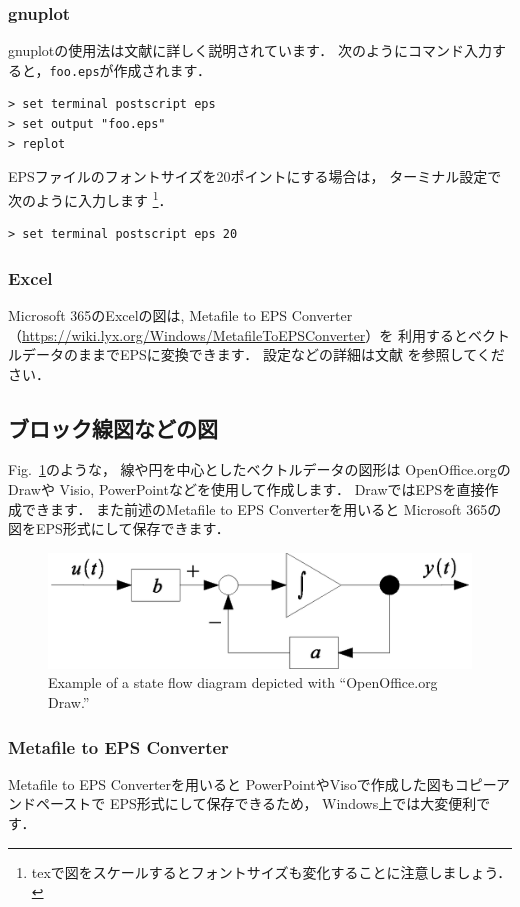 \documentclass[twocolumn]{jsarticle}
\begin{document}
\subsubsection{gnuplot}
gnuplotの使用法は文献\cite{GnuplotPerfect,GnuplotTP}に詳しく説明されています．
次のようにコマンド入力すると，\texttt{foo.eps}が作成されます．
\begin{verbatim}
> set terminal postscript eps
> set output "foo.eps"
> replot
\end{verbatim}
EPSファイルのフォントサイズを20ポイントにする場合は，
ターミナル設定で次のように入力します
\footnote{texで図をスケールするとフォントサイズも変化することに注意しましょう．}．
\begin{verbatim}
> set terminal postscript eps 20
\end{verbatim}

\subsubsection{Excel}
Microsoft 365のExcelの図は, Metafile to EPS Converter
（\url{https://wiki.lyx.org/Windows/MetafileToEPSConverter}）を
利用するとベクトルデータのままでEPSに変換できます．
設定などの詳細は文献\cite{Metafile2EPSConverter} を参照してください．

\subsection{ブロック線図などの図}
Fig.~\ref{fig:block}のような，
線や円を中心としたベクトルデータの図形は
OpenOffice.orgのDrawや
Visio, PowerPointなどを使用して作成します．
DrawではEPSを直接作成できます．
また前述のMetafile to EPS Converterを用いると
Microsoft 365の図をEPS形式にして保存できます．
% 
\begin{figure}[tb]
  \centering
  \includegraphics[width=0.9\linewidth]{fig/SFDiagram.eps}
  \caption{Example of a state flow diagram depicted with ``OpenOffice.org Draw.''}
  \label{fig:block}
\end{figure}

\subsubsection{Metafile to EPS Converter}
Metafile to EPS Converterを用いると
PowerPointやVisoで作成した図もコピーアンドペーストで
EPS形式にして保存できるため，
Windows上では大変便利です\cite{Metafile2EPSConverter}．
\end{document}

